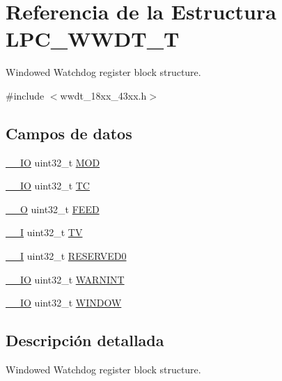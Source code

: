 \hypertarget{struct_l_p_c___w_w_d_t___t}{}\section{Referencia de la Estructura L\+P\+C\+\_\+\+W\+W\+D\+T\+\_\+T}
\label{struct_l_p_c___w_w_d_t___t}


Windowed Watchdog register block structure.  




{\ttfamily \#include $<$wwdt\+\_\+18xx\+\_\+43xx.\+h$>$}

\subsection*{Campos de datos}
\begin{DoxyCompactItemize}
\item 
\hyperlink{core__sc300_8h_aec43007d9998a0a0e01faede4133d6be}{\+\_\+\+\_\+\+IO} uint32\+\_\+t \hyperlink{struct_l_p_c___w_w_d_t___t_aa35a6713b1e2aafa0749f986730795cb}{M\+OD}
\item 
\hyperlink{core__sc300_8h_aec43007d9998a0a0e01faede4133d6be}{\+\_\+\+\_\+\+IO} uint32\+\_\+t \hyperlink{struct_l_p_c___w_w_d_t___t_abb0bc781f4dc091c913978e313c03d25}{TC}
\item 
\hyperlink{core__sc300_8h_a7e25d9380f9ef903923964322e71f2f6}{\+\_\+\+\_\+O} uint32\+\_\+t \hyperlink{struct_l_p_c___w_w_d_t___t_afb3d081ef6e3f567ec250f7e0abc26a4}{F\+E\+ED}
\item 
\hyperlink{core__sc300_8h_af63697ed9952cc71e1225efe205f6cd3}{\+\_\+\+\_\+I} uint32\+\_\+t \hyperlink{struct_l_p_c___w_w_d_t___t_ac7f33c773f59346c097bd9c2e544af28}{TV}
\item 
\hyperlink{core__sc300_8h_af63697ed9952cc71e1225efe205f6cd3}{\+\_\+\+\_\+I} uint32\+\_\+t \hyperlink{struct_l_p_c___w_w_d_t___t_ad06839c5382047f4f9f2c74cc61db942}{R\+E\+S\+E\+R\+V\+E\+D0}
\item 
\hyperlink{core__sc300_8h_aec43007d9998a0a0e01faede4133d6be}{\+\_\+\+\_\+\+IO} uint32\+\_\+t \hyperlink{struct_l_p_c___w_w_d_t___t_a35d90fc251dd2f0e5125c7cee94020c4}{W\+A\+R\+N\+I\+NT}
\item 
\hyperlink{core__sc300_8h_aec43007d9998a0a0e01faede4133d6be}{\+\_\+\+\_\+\+IO} uint32\+\_\+t \hyperlink{struct_l_p_c___w_w_d_t___t_a0ce43cecac8e564afd27fe0489eaff41}{W\+I\+N\+D\+OW}
\end{DoxyCompactItemize}


\subsection{Descripción detallada}
Windowed Watchdog register block structure. 

